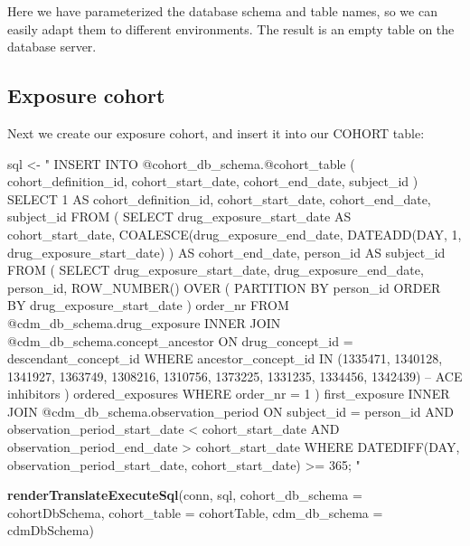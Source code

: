 \documentclass[11pt]{book}
\newenvironment{Shaded}{\begin{snugshade}}{\end{snugshade}}
\newcommand{\DataTypeTok}[1]{\textcolor[rgb]{0.13,0.29,0.53}{#1}}
\newcommand{\KeywordTok}[1]{\textcolor[rgb]{0.13,0.29,0.53}{\textbf{#1}}}
\newcommand{\NormalTok}[1]{#1}
\newcommand{\StringTok}[1]{\textcolor[rgb]{0.31,0.60,0.02}{#1}}
\theoremstyle{definition}
\theoremstyle{definition}
\theoremstyle{definition}
\theoremstyle{remark}
\begin{document}
Here we have parameterized the database schema and table names, so we can easily adapt them to different environments. The result is an empty table on the database server.

\hypertarget{exposure-cohort}{%
\subsection{Exposure cohort}\label{exposure-cohort}}

Next we create our exposure cohort, and insert it into our COHORT table:

\begin{Shaded}
\begin{Highlighting}[]
\NormalTok{sql <-}\StringTok{ "}
\StringTok{INSERT INTO @cohort_db_schema.@cohort_table (}
\StringTok{  cohort_definition_id,}
\StringTok{  cohort_start_date,}
\StringTok{  cohort_end_date,}
\StringTok{  subject_id}
\StringTok{)}
\StringTok{SELECT 1 AS cohort_definition_id,}
\StringTok{  cohort_start_date,}
\StringTok{  cohort_end_date,}
\StringTok{  subject_id}
\StringTok{FROM (}
\StringTok{  SELECT drug_exposure_start_date AS cohort_start_date,}
\StringTok{    COALESCE(drug_exposure_end_date,}
\StringTok{             DATEADD(DAY, 1, drug_exposure_start_date)}
\StringTok{    ) AS cohort_end_date,}
\StringTok{    person_id AS subject_id}
\StringTok{  FROM (}
\StringTok{    SELECT drug_exposure_start_date,}
\StringTok{      drug_exposure_end_date,}
\StringTok{      person_id,}
\StringTok{      ROW_NUMBER() OVER (}
\StringTok{        PARTITION BY person_id}
\StringTok{            ORDER BY drug_exposure_start_date}
\StringTok{      ) order_nr}
\StringTok{    FROM @cdm_db_schema.drug_exposure}
\StringTok{    INNER JOIN @cdm_db_schema.concept_ancestor}
\StringTok{      ON drug_concept_id = descendant_concept_id}
\StringTok{    WHERE ancestor_concept_id IN (1335471, 1340128, 1341927,}
\StringTok{      1363749, 1308216, 1310756, 1373225, 1331235, 1334456,}
\StringTok{      1342439) -- ACE inhibitors}
\StringTok{  ) ordered_exposures}
\StringTok{  WHERE order_nr = 1}
\StringTok{) first_exposure}
\StringTok{INNER JOIN @cdm_db_schema.observation_period}
\StringTok{  ON subject_id = person_id}
\StringTok{    AND observation_period_start_date < cohort_start_date}
\StringTok{    AND observation_period_end_date > cohort_start_date}
\StringTok{WHERE DATEDIFF(DAY,}
\StringTok{               observation_period_start_date,}
\StringTok{               cohort_start_date) >= 365;}
\StringTok{"}

\KeywordTok{renderTranslateExecuteSql}\NormalTok{(conn, sql,}
                          \DataTypeTok{cohort_db_schema =}\NormalTok{ cohortDbSchema,}
                          \DataTypeTok{cohort_table =}\NormalTok{ cohortTable,}
                          \DataTypeTok{cdm_db_schema =}\NormalTok{ cdmDbSchema)}
\end{Highlighting}
\end{Shaded}
\end{document}
